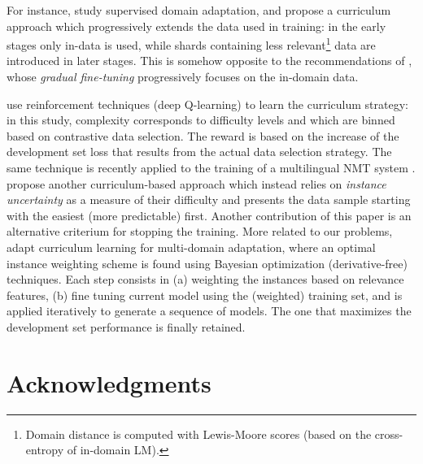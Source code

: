\documentclass[11pt]{article}
\newcommand{\fyTodo}[1]{\Todo[FY:]{\textcolor{orange}{#1}}}
\begin{document}
For instance, \citet{Zhang19curriculum} study supervised domain adaptation, and propose a curriculum approach which progressively extends the data used in training: in the early stages only in-data is used, while shards containing less relevant\footnote{Domain distance is computed with Lewis-Moore scores (based on the cross-entropy of in-domain LM).} data are introduced in later stages. This is somehow opposite to the recommendations of \citet{Vanderwees17dynamic}, whose \emph{gradual fine-tuning} progressively focuses on the in-domain data.\fyTodo{These have not been compared ? and also to what we do ?} 

\citet{Kumar19reinforcement} use reinforcement techniques (deep Q-learning) to learn the curriculum strategy: in this study, complexity corresponds to difficulty levels and which are binned based on contrastive data selection. The reward is based on the increase of the development set loss that results from the actual data selection strategy.\fyTodo{Alert: what do we do during warm up ?} The same technique is recently applied to the training of a multilingual NMT system \citep{Kumar21learning}. \citet{Zhou20uncertainty} propose another curriculum-based approach which instead relies on \emph{instance uncertainty} as a measure of their difficulty and presents the data sample starting with the easiest (more predictable) first. Another contribution of this paper is an alternative criterium for stopping the training. More related to our problems, \citet{Wang20learning-multi} adapt curriculum learning for multi-domain adaptation, where an optimal instance weighting scheme is found using Bayesian optimization (derivative-free) techniques. Each step consists in (a) weighting the instances based on relevance features, (b) fine tuning current model using the (weighted) training set, and is applied iteratively to generate a sequence of models. The one that maximizes the development set performance is finally retained.

\section*{Acknowledgments}


\end{document}
